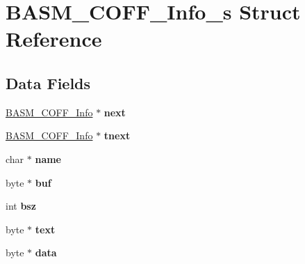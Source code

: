 \hypertarget{structBASM__COFF__Info__s}{\section{B\-A\-S\-M\-\_\-\-C\-O\-F\-F\-\_\-\-Info\-\_\-s Struct Reference}
\label{structBASM__COFF__Info__s}
}
\subsection*{Data Fields}
\begin{DoxyCompactItemize}
\item 
\hypertarget{structBASM__COFF__Info__s_af10811893cd01e2cf5ef539d75e1b8da}{\hyperlink{structBASM__COFF__Info__s}{B\-A\-S\-M\-\_\-\-C\-O\-F\-F\-\_\-\-Info} $\ast$ {\bfseries next}}\label{structBASM__COFF__Info__s_af10811893cd01e2cf5ef539d75e1b8da}

\item 
\hypertarget{structBASM__COFF__Info__s_a0c58d670943016c384c93533e72b4e74}{\hyperlink{structBASM__COFF__Info__s}{B\-A\-S\-M\-\_\-\-C\-O\-F\-F\-\_\-\-Info} $\ast$ {\bfseries tnext}}\label{structBASM__COFF__Info__s_a0c58d670943016c384c93533e72b4e74}

\item 
\hypertarget{structBASM__COFF__Info__s_a37cfdb7cba8a2c8f3acef27e2d42ed4b}{char $\ast$ {\bfseries name}}\label{structBASM__COFF__Info__s_a37cfdb7cba8a2c8f3acef27e2d42ed4b}

\item 
\hypertarget{structBASM__COFF__Info__s_a5606ea93362b652dbe2e2716c4fc1b6a}{byte $\ast$ {\bfseries buf}}\label{structBASM__COFF__Info__s_a5606ea93362b652dbe2e2716c4fc1b6a}

\item 
\hypertarget{structBASM__COFF__Info__s_a1811deb5f313f5e8482f21d6ef797ecd}{int {\bfseries bsz}}\label{structBASM__COFF__Info__s_a1811deb5f313f5e8482f21d6ef797ecd}

\item 
\hypertarget{structBASM__COFF__Info__s_a57fe13ff0742d2c347f8cade10cb8858}{byte $\ast$ {\bfseries text}}\label{structBASM__COFF__Info__s_a57fe13ff0742d2c347f8cade10cb8858}

\item 
\hypertarget{structBASM__COFF__Info__s_a88a89b7236b307ccea4b636242c58d73}{byte $\ast$ {\bfseries data}}\label{structBASM__COFF__Info__s_a88a89b7236b307ccea4b636242c58d73}


\end{DoxyCompactItemize}
